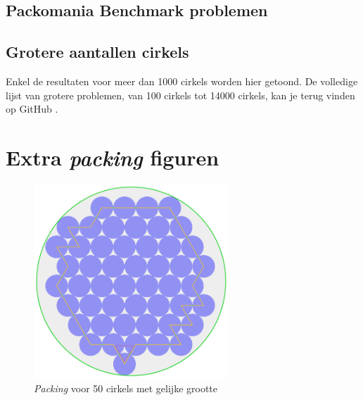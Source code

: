 \documentclass[12pt,a4paper,oneside]{book}
\begin{document}
\section{Packomania Benchmark problemen} \label{append:packomania-tabellen-benchmark}


\section{Grotere aantallen cirkels} \label{append:packomania-tabellen-groter-aantal-cirkels}

Enkel de resultaten voor meer dan 1000 cirkels worden hier getoond.
De volledige lijst van grotere problemen, van 100 cirkels tot 14000 cirkels, kan je terug vinden op GitHub \cite{packomania-tables-github}.






\chapter{Extra \textit{packing} figuren} \label{append:extra-packing-figuren}


\begin{figure}
  \centering
  \includegraphics[width=0.65\textwidth]{packing-even-groot-50.png}
  \caption{\textit{Packing} voor 50 cirkels met gelijke grootte}
\end{figure}
\end{document}
